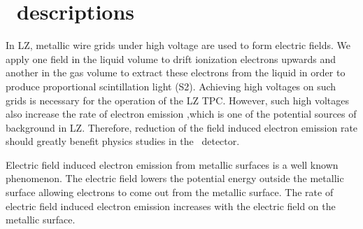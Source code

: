 \chapter{\gtest\ descriptions}
\label{chap:gtestdescription}


In LZ, metallic wire grids under high voltage are used to form electric fields. We apply one field in the liquid volume to drift ionization electrons upwards and another in the gas volume to extract these electrons from the liquid in order to produce proportional scintillation light (S2). Achieving high voltages on such grids is necessary for the operation of the LZ TPC. However, such high voltages also increase the rate of electron emission ,which is one of the potential sources of background in LZ.
Therefore, reduction of the field induced electron emission rate should greatly benefit physics studies in the \lze\ detector.

Electric field induced electron emission from metallic surfaces is a well known phenomenon. The electric field lowers the potential energy outside the metallic surface allowing electrons to come out from the metallic surface. The rate of electric field induced electron emission increases with the electric field on the metallic surface. 




